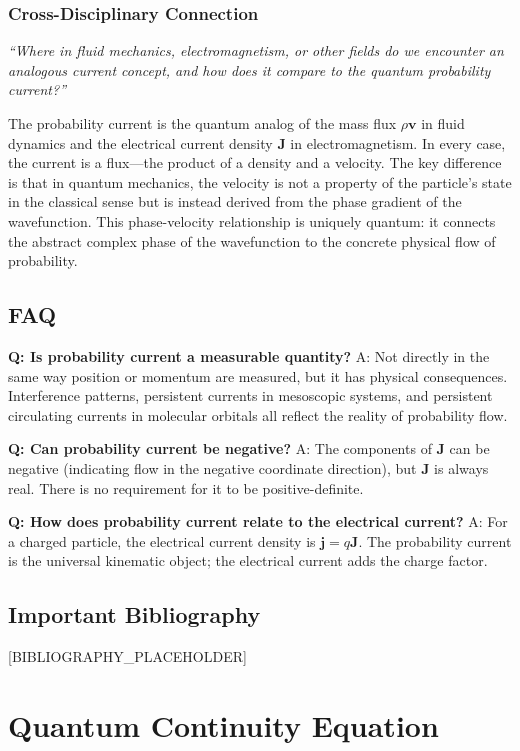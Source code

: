 \documentclass[11pt,openright]{book}
\begin{document}
\subsection*{Cross-Disciplinary Connection}
\textit{``Where in fluid mechanics, electromagnetism, or other fields do we encounter an analogous current concept, and how does it compare to the quantum probability current?''}

The probability current is the quantum analog of the mass flux $\rho\mathbf{v}$ in fluid dynamics and the electrical current density $\mathbf{J}$ in electromagnetism. In every case, the current is a flux---the product of a density and a velocity. The key difference is that in quantum mechanics, the velocity is not a property of the particle's state in the classical sense but is instead derived from the phase gradient of the wavefunction. This phase-velocity relationship is uniquely quantum: it connects the abstract complex phase of the wavefunction to the concrete physical flow of probability.

\section*{FAQ}

\textbf{Q: Is probability current a measurable quantity?}
A: Not directly in the same way position or momentum are measured, but it has physical consequences. Interference patterns, persistent currents in mesoscopic systems, and persistent circulating currents in molecular orbitals all reflect the reality of probability flow.

\textbf{Q: Can probability current be negative?}
A: The components of $\mathbf{J}$ can be negative (indicating flow in the negative coordinate direction), but $\mathbf{J}$ is always real. There is no requirement for it to be positive-definite.

\textbf{Q: How does probability current relate to the electrical current?}
A: For a charged particle, the electrical current density is $\mathbf{j} = q\mathbf{J}$. The probability current is the universal kinematic object; the electrical current adds the charge factor.
\section*{Important Bibliography}

[BIBLIOGRAPHY_PLACEHOLDER]


\chapter{Quantum Continuity Equation}
\end{document}
